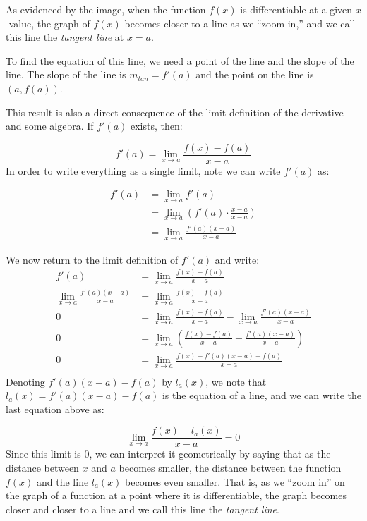 \documentclass[nooutcomes]{ximera}
\begin{document}
As evidenced by the image, when the function $f(x)$ is differentiable
at a given $x$-value, the graph of $f(x)$ becomes closer to a line as
we ``zoom in,'' and we call this line the \emph{tangent line} at $x=a$.

To find the equation of this line, we need a point of the line and the
slope of the line.  The slope of the line is $m_{tan} =f'(a)$ and the
point on the line is $(a,f(a))$.


This result is also a direct consequence of the limit definition of
the derivative and some algebra.  If $f'(a)$ exists, then:

\[
f'(a) = \lim_{x \to a} \frac{f(x)-f(a)}{x-a}
\]
In order to write everything as a single limit, note we can write $f'(a)$ as:

\begin{align*}
  f'(a) &= \lim_{x \to a} f'(a)\\
  &= \lim_{x \to a} \left(f'(a) \cdot
  \frac{x-a}{x-a}\right)\\
  &= \lim_{x \to a} \frac{f'(a)(x-a)}{x-a}
\end{align*}

We now return to the limit definition of $f'(a)$ and write: 
\begin{align*}
f'(a) &= \lim_{x \to a} \frac{f(x)-f(a)}{x-a}\\
\lim_{x \to a} \frac{f'(a)(x-a)}{x-a} &= \lim_{x \to a} \frac{f(x)-f(a)}{x-a}\\
0 &= \lim_{x \to a} \frac{f(x)-f(a)}{x-a} - \lim_{x \to a} \frac{f'(a)(x-a)}{x-a}\\
0 &= \lim_{x \to a} \left(\frac{f(x)-f(a)}{x-a} - \frac{f'(a)(x-a)}{x-a} \right)\\
0 &= \lim_{x \to a} \frac{f(x)-f'(a)(x-a) - f(a)}{x-a}\\
\end{align*} 
Denoting $ f'(a)(x-a) - f(a)$ by $l_a(x)$, we note that $l_a(x)= f'(a)(x-a) - f(a)$ is the equation of a line, and we can write the last equation above as:

\[
\lim_{x \to a} \frac{f(x)-l_a(x)}{x-a} = 0
\]
Since this limit is $0$, we can interpret it geometrically by saying
that as the distance between $x$ and $a$ becomes smaller, the distance
between the function $f(x)$ and the line $l_a(x)$ becomes even
smaller.  That is, as we ``zoom in'' on the graph of a function at a
point where it is differentiable, the graph becomes closer and closer
to a line and we call this line the \emph{tangent line}.
\end{document}
